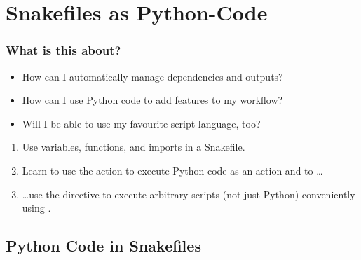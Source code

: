\section{Snakefiles as Python-Code}
{   
}

\begin{frame}
  \frametitle{What is this about?}
   \begin{question}[Questions]
   	 \begin{itemize}
        \item How can I automatically manage dependencies and outputs?
        \item How can I use Python code to add features to my workflow?
        \item Will I be able to use my favourite script language, too?
     \end{itemize}
   \end{question}
   \begin{docs}[Objectives]
   	  \begin{enumerate}
         \item Use variables, functions, and imports in a Snakefile. 
         \item Learn to use the  action to execute Python code as an action and to \ldots
         \item \ldots use the  directive to execute arbitrary scripts (not just Python) conveniently using \Snakemake.
       \end{enumerate}
   \end{docs}
\end{frame}

\subsection{Python Code in Snakefiles}

